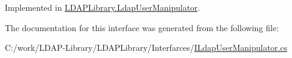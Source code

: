 Implemented in \hyperlink{class_l_d_a_p_library_1_1_ldap_user_manipulator_ab881e29e6737faaeaefbe999e5d7f3d7}{L\+D\+A\+P\+Library.\+Ldap\+User\+Manipulator}.



The documentation for this interface was generated from the following file\+:\begin{DoxyCompactItemize}
\item 
C\+:/work/\+L\+D\+A\+P-\/\+Library/\+L\+D\+A\+P\+Library/\+Interfarces/\hyperlink{_i_ldap_user_manipulator_8cs}{I\+Ldap\+User\+Manipulator.\+cs}\end{DoxyCompactItemize}
